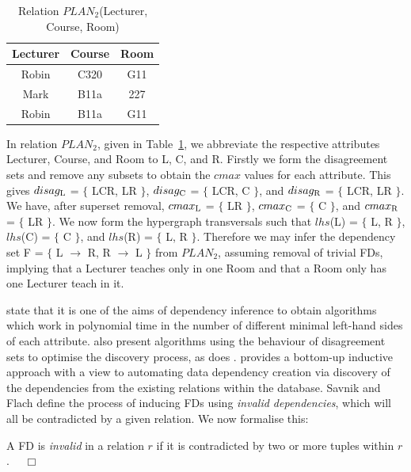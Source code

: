 {\line
\begin{table}[ht]
\begin{center}
\begin{tabular}{||c|c|c||} \hline
{ \bf Lecturer} & { \bf Course} & { \bf Room} \\ \hline
 Robin & C320 & G11 \\
 Mark  & B11a & 227 \\
 Robin & B11a & G11 \\ \hline
\end{tabular}
\end{center}
\caption{\label{tbl:depinf} Relation $PLAN_2$(Lecturer, Course, Room)} 
\end{table}
}


\begin{example}
\begin{rm} 
In relation $PLAN_2$, given in Table~\ref{tbl:depinf}, we abbreviate the
respective attributes Lecturer, Course, and Room to L, C, and
R. Firstly we form the disagreement sets and remove any subsets to
obtain the $cmax$ values for each attribute. This gives
$disag_{\rm L}$ = $\{$ LCR, LR $\}$, $disag_{\rm C}$ = $\{$ LCR, C $\}$, and $disag_{\rm R}$
= $\{$ LCR, LR $\}$. We have, after superset removal,  $cmax_{\rm L}$
= $\{$ LR $\}$, $cmax_{\rm C}$ = $\{$ C $\}$, and $cmax_{\rm R}$ 
= $\{$ LR $\}$. We now form the hypergraph transversals such that
$lhs$(L) = $\{$ L, R $\}$, $lhs$(C) = $\{$ C $\}$, and $lhs$(R) = $\{$
L, R $\}$. Therefore we may infer
the dependency set F = $\{$ L $\to$ R, R $\to$ L $\}$ from $PLAN_2$,
assuming removal of trivial FDs, implying that a Lecturer teaches only
in one Room and that a Room only has one Lecturer teach in it.
\end{rm}
\end{example}


\cite{mr92} state that it is
one of the aims of dependency inference to 
obtain algorithms which work in polynomial time in the number of 
different minimal left-hand sides of each attribute. \cite{bmt89,Mann92}
also present algorithms using the behaviour of disagreement sets to
optimise the discovery process, as does \cite{sf93}. 
\cite{sf93} provides a bottom-up inductive approach with a view to
automating data dependency creation via discovery of the dependencies
from the existing relations within the database.  Savnik and Flach define
the process of inducing FDs using {\em invalid
dependencies}, which will all be contradicted by a given relation. 
We now formalise this:
\begin{definition}
\begin{rm}
A FD is {\em invalid} in a relation $r$
if it is contradicted by two or more tuples within $r$. $\quad\Box$
\end{rm}
\end{definition}


